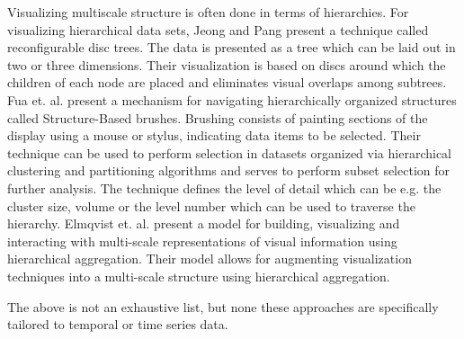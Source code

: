 Visualizing multiscale structure is often done in terms of hierarchies. For visualizing hierarchical data sets, 
Jeong and Pang \cite{729555} present a technique called reconfigurable disc trees. The data is presented as a tree which can be laid out in two or three dimensions.
Their visualization is based on discs around which the children of each node are placed and eliminates
visual overlaps among subtrees.
%
%
Fua et. al. \cite{Fua:2000:SBM:614278.614457} present a mechanism for navigating hierarchically organized structures
called Structure-Based brushes. Brushing consists of painting sections of the display using a mouse or stylus, indicating
data items to be selected. Their technique can be used to perform selection in datasets organized via hierarchical
clustering and partitioning algorithms and serves to perform subset selection for further analysis. The technique defines
the level of detail which can be e.g. the cluster size, volume or the level number which can be used to traverse the
hierarchy.
%
Elmqvist et. al. \cite{Elmqvist:2010:HAI:1749404.1749525} present a model for building, visualizing and interacting with
multi-scale representations of visual information using hierarchical aggregation. Their model allows for augmenting visualization
techniques into a multi-scale structure using hierarchical aggregation.


The above is not an exhaustive list, but none these approaches are specifically tailored to temporal or time series data.


